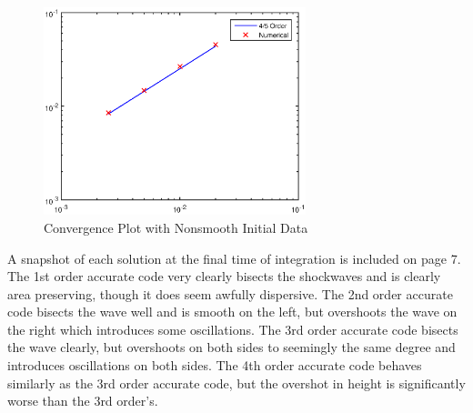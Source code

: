 \begin{figure}[h]
\includegraphics[width=3in]{80conv}
\caption{Convergence Plot with Nonsmooth Initial Data}
\end{figure}

A snapshot of each solution at the final time of integration is included on page 7. The 1st order accurate code very clearly bisects the shockwaves and is clearly area preserving, though it does seem awfully dispersive. The 2nd order accurate code bisects the wave well and is smooth on the left, but overshoots the wave on the right which introduces some oscillations. The 3rd order accurate code bisects the wave clearly, but overshoots on both sides to seemingly the same degree and introduces oscillations on both sides. The 4th order accurate code behaves similarly as the 3rd order accurate code, but the overshot in height is significantly worse than the 3rd order's. 
